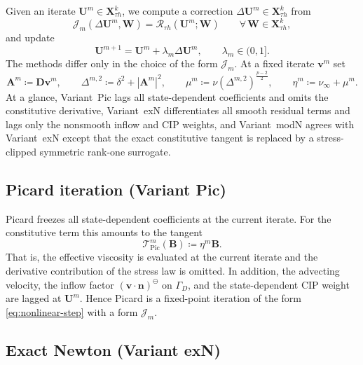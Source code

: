\documentclass[DIV=16]{scrartcl}
\newcommand{\abs}[1]{\left\lvert #1\right\rvert}
\newcommand{\uu}{\boldsymbol v}
\newcommand{\nn}{\boldsymbol n}
\newcommand{\DD}{\boldsymbol D} %
\newcommand{\Pic}{\mathrm{Pic}}
\newcommand{\GhD}{\Gamma_{D}}
\newcommand{\negpart}{\ominus}
\newcommand{\yneg}[1]{\left(#1\right)^{\negpart}}
\newcommand{\reg}{\delta}
\newcommand{\pn}{p}
\begin{document}
Given an iterate $\bm U^m\in \boldsymbol X_{\tau h}^k$, we compute a correction
$\Delta\bm U^m\in \boldsymbol X_{\tau h}^k$ from
\begin{equation}\label{eq:nonlinear-step}
  \mathcal J_m(\Delta\bm U^m,\bm W)
  = \mathcal R_{\tau h}(\bm U^m;\bm W)
  \qquad \forall\,\bm W\in \boldsymbol X_{\tau h}^k,
\end{equation}
and update
\[
  \bm U^{m+1}=\bm U^m+\lambda_m\Delta\bm U^m,
  \qquad \lambda_m\in(0,1].
\]
The methods differ only in the choice of the form $\mathcal J_m$. At a fixed
iterate $\uu^m$ set
\[
  \bm A^m \coloneq \DD\uu^m,
  \qquad
  \Delta^{m,2}\coloneq \reg^2+\abs{\bm A^m}^2,
  \qquad
  \mu^m \coloneq \nu(\Delta^{m,2})^{\frac{\pn-2}{2}},
  \qquad
  \eta^m \coloneq \nu_\infty+\mu^m.
\]
At a glance, Variant~Pic lags all state-dependent coefficients and omits the
constitutive derivative, Variant~exN differentiates all smooth residual terms
and lags only the nonsmooth inflow and CIP weights, and Variant~modN agrees
with Variant~exN except that the exact constitutive tangent is replaced by a
stress-clipped symmetric rank-one surrogate.

\subsection{Picard iteration (Variant Pic)}
\label{sec:newton:picard}

Picard freezes all state-dependent coefficients at the current iterate.
For the constitutive term this amounts to the tangent
\begin{equation}\label{eq:local-tangent-picard}
  \mathcal T_{\Pic}^m(\bm B)\coloneq \eta^m \bm B.
\end{equation}
That is, the effective viscosity is evaluated at the current iterate and the
derivative contribution of the stress law is omitted.
In addition, the advecting velocity, the inflow factor
$\yneg{\uu\cdot\nn}$ on $\GhD$, and the state-dependent CIP weight are
lagged at $\bm U^m$.
Hence Picard is a fixed-point iteration of the form \eqref{eq:nonlinear-step}
with a form $\mathcal J_m$.

\subsection{Exact Newton (Variant exN)}
\label{sec:newton:exact}
\end{document}
